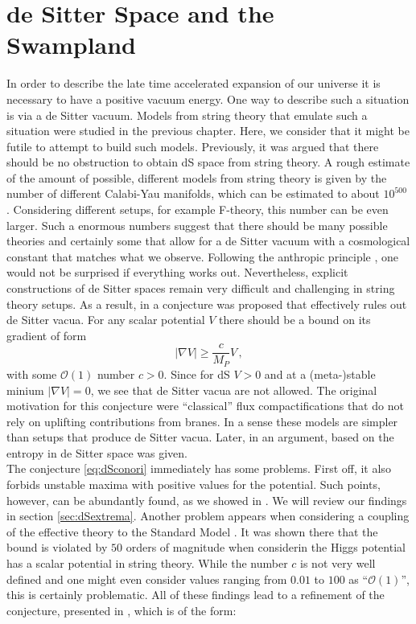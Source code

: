 \documentclass[12pt]{report}
\newcommand{\be}{\begin{equation}}
\newcommand{\ee}{\end{equation}}
\begin{document}
\section{de Sitter Space and the Swampland}
In order to describe the late time accelerated expansion of our universe it is necessary to have a positive vacuum energy. One way to describe such a situation is via a de Sitter vacuum. Models from string theory that emulate such a situation were studied in the previous chapter. Here, we consider that it might be futile to attempt to build such models. Previously, it was argued that there should be no obstruction to obtain dS space from string theory. A rough estimate of the amount of possible, different models from string theory is given by the number of different Calabi-Yau manifolds, which can be estimated to about $10^{500}$ \cite{Blumenhagen:2004xx}. Considering different setups, for example F-theory, this number can be even larger. Such a enormous numbers suggest that there should be many possible theories and certainly some that allow for a de Sitter vacuum with a cosmological constant that matches what we observe. Following the anthropic principle \cite{Weinberg:1987dv}, one would not be surprised if everything works out. Nevertheless, explicit constructions of de Sitter spaces remain very difficult and challenging in string theory setups. As a result, in \cite{Obied:2018sgi} a conjecture was proposed that effectively rules out de Sitter vacua. For any scalar potential $V$ there should be a bound on its gradient of form
\be 
|\nabla V| \geq \frac{c}{M_P} V\,,
\label{eq:dSconori}
\ee
with some $\mathcal{O}(1)$ number $c>0$. Since for dS $V>0$ and at a (meta-)stable minium $|\nabla V| = 0$, we see that de Sitter vacua are not allowed. The original motivation for this conjecture were ``classical'' flux compactifications that do not rely on uplifting contributions from branes. In a sense these models are simpler than setups that produce de Sitter vacua. Later, in \cite{Ooguri:2018wrx} an argument, based on the entropy in de Sitter space was given.\\
The conjecture \eqref{eq:dSconori} immediately has some problems. First off, it also forbids unstable maxima with positive values for the potential. Such points, however, can be abundantly found, as we showed in \cite{Roupec:2018mbn}. We will review our findings in section \ref{sec:dSextrema}. Another problem appears when considering a coupling of the effective theory to the Standard Model \cite{Denef:2018etk}. It was shown there that the bound is violated by $50$ orders of magnitude when considerin the Higgs potential has a scalar potential in string theory. While the number $c$ is not very well defined and one might even consider values ranging from $0.01$ to $100$ as ``$\mathcal{O}(1)$'', this is certainly problematic. All of these findings lead to a refinement of the conjecture, presented in \cite{Ooguri:2018wrx}, which is of the form:
\end{document}

